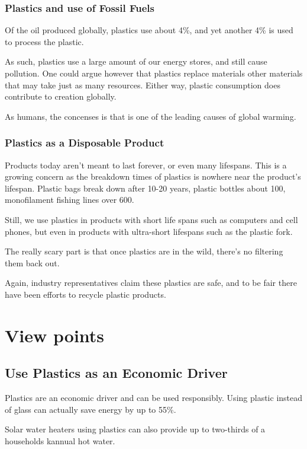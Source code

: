 \documentclass[paper=a4, fontsize=11pt]{article}
\begin{document}
\subsubsection{Plastics and use of Fossil Fuels}
Of the oil produced globally, plastics use about 4\%, and yet another 4\% is used to process the plastic. \cite{eia}

As such, plastics use a large amount of our energy stores, and still cause pollution. One could argue however that plastics replace materials other materials that may take 
just as many resources. Either way, plastic consumption does contribute to  creation globally. 

As humans, the concenses is that  is one of the leading causes of global warming. 

\subsubsection{Plastics as a Disposable Product}
Products today aren't meant to last forever, or even many lifespans. This is a growing concern as the breakdown times of plastics is nowhere near the
product's lifespan. Plastic bags break down after 10-20 years, plastic bottles about 100, monofilament fishing lines over 
600.\cite{super}

Still, we use plastics in products with short life spans such as computers and cell phones, but even in products with ultra-short lifespans such as the plastic fork.

The really scary part is that once plastics are in the wild, there's no filtering them back out.

Again, industry representatives claim these plastics are safe, and to be fair there have been efforts to recycle plastic products.

\section{View points}

\subsection{Use Plastics as an Economic Driver}
Plastics are an economic driver and can be used responsibly. Using plastic instead of glass can actually save energy by up to 
55\%. \cite{ehn}

Solar water heaters using plastics can also provide up to two-thirds of a households kannual hot 
water. \cite{what_plastics}
\end{document}
